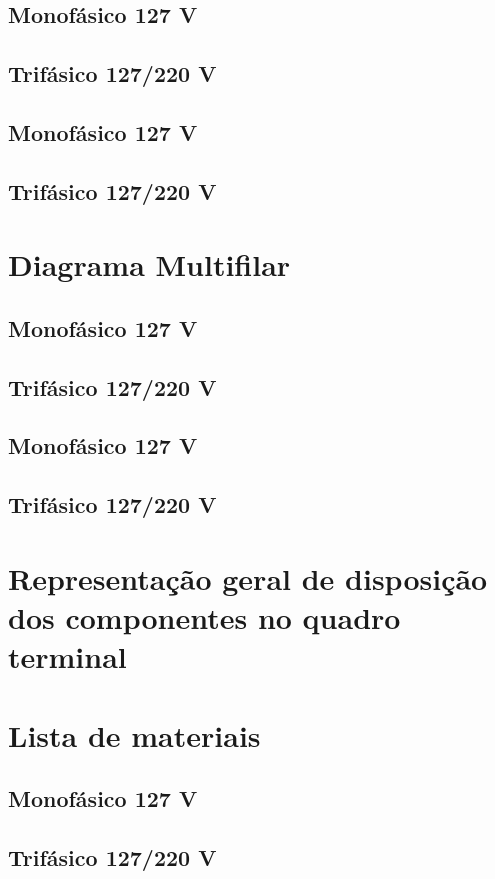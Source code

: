\subsection{Monofásico 127 V}
\subsection{Trifásico 127/220 V}
\subsection{Monofásico 127 V}
\subsection{Trifásico 127/220 V}

\section{Diagrama Multifilar}
\subsection{Monofásico 127 V}
\subsection{Trifásico 127/220 V}
\subsection{Monofásico 127 V}
\subsection{Trifásico 127/220 V}

\section{Representação geral de disposição dos componentes no quadro terminal}

\section{Lista de materiais}
\subsection{Monofásico 127 V}
\subsection{Trifásico 127/220 V}
